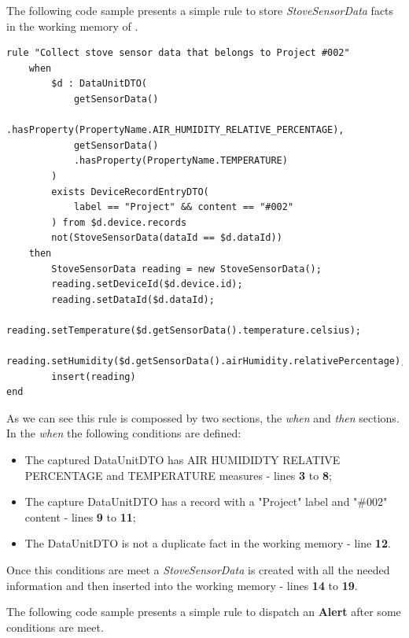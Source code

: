 The following code sample presents a simple rule to store \textit{StoveSensorData} facts in the working memory of . 

\begin{lstlisting}[caption=Rule Scenario Example - Part 2, label={code:implementation:description:rule:sample2}] 
rule "Collect stove sensor data that belongs to Project #002"
    when
        $d : DataUnitDTO(
            getSensorData()
            .hasProperty(PropertyName.AIR_HUMIDITY_RELATIVE_PERCENTAGE),
            getSensorData()
            .hasProperty(PropertyName.TEMPERATURE)
        )
        exists DeviceRecordEntryDTO(
            label == "Project" && content == "#002"
        ) from $d.device.records
        not(StoveSensorData(dataId == $d.dataId))
    then
        StoveSensorData reading = new StoveSensorData();
        reading.setDeviceId($d.device.id);
        reading.setDataId($d.dataId);
        reading.setTemperature($d.getSensorData().temperature.celsius);
        reading.setHumidity($d.getSensorData().airHumidity.relativePercentage);
        insert(reading)
end
\end{lstlisting}

As we can see this rule is compossed by two sections, the \textit{when} and \textit{then} sections. In the \textit{when} the following conditions are defined:

\begin{itemize}
    \item The captured DataUnitDTO has AIR HUMIDIDTY RELATIVE PERCENTAGE and TEMPERATURE measures - lines \textbf{3} to \textbf{8};
    \item The capture DataUnitDTO has a record with a "Project" label and "\#002" content - lines \textbf{9} to \textbf{11};
    \item The DataUnitDTO is not a duplicate fact in the working memory - line \textbf{12}.
\end{itemize}

Once this conditions are meet a \textit{StoveSensorData} is created with all the needed information and then inserted into the working memory - lines \textbf{14} to \textbf{19}.

The following code sample presents a simple rule to dispatch an \textbf{Alert} after some conditions are meet. 

